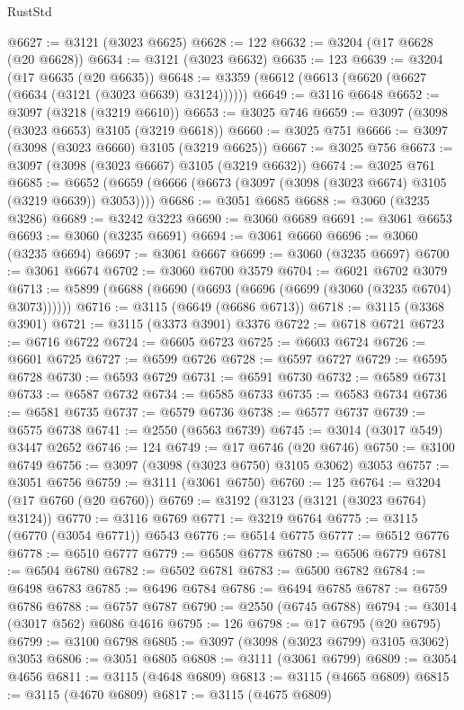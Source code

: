\begin{lexlean}{RustStd}
\begin{coremodule}
@6627 := @3121 (@3023 @6625)
@6628 := 122
@6632 := @3204 (@17 @6628 (@20 @6628))
@6634 := @3121 (@3023 @6632)
@6635 := 123
@6639 := @3204 (@17 @6635 (@20 @6635))
@6648 := @3359 (@6612 (@6613 (@6620 (@6627 (@6634 (@3121 (@3023 @6639) @3124))))))
@6649 := @3116 @6648
@6652 := @3097 (@3218 (@3219 @6610))
@6653 := @3025 @746
@6659 := @3097 (@3098 (@3023 @6653) @3105 (@3219 @6618))
@6660 := @3025 @751
@6666 := @3097 (@3098 (@3023 @6660) @3105 (@3219 @6625))
@6667 := @3025 @756
@6673 := @3097 (@3098 (@3023 @6667) @3105 (@3219 @6632))
@6674 := @3025 @761
@6685 := @6652 (@6659 (@6666 (@6673 (@3097 (@3098 (@3023 @6674) @3105 (@3219 @6639)) @3053))))
@6686 := @3051 @6685
@6688 := @3060 (@3235 @3286)
@6689 := @3242 @3223
@6690 := @3060 @6689
@6691 := @3061 @6653
@6693 := @3060 (@3235 @6691)
@6694 := @3061 @6660
@6696 := @3060 (@3235 @6694)
@6697 := @3061 @6667
@6699 := @3060 (@3235 @6697)
@6700 := @3061 @6674
@6702 := @3060 @6700 @3579
@6704 := @6021 @6702 @3079
@6713 := @5899 (@6688 (@6690 (@6693 (@6696 (@6699 (@3060 (@3235 @6704) @3073))))))
@6716 := @3115 (@6649 (@6686 @6713))
@6718 := @3115 (@3368 @3901)
@6721 := @3115 (@3373 @3901) @3376
@6722 := @6718 @6721
@6723 := @6716 @6722
@6724 := @6605 @6723
@6725 := @6603 @6724
@6726 := @6601 @6725
@6727 := @6599 @6726
@6728 := @6597 @6727
@6729 := @6595 @6728
@6730 := @6593 @6729
@6731 := @6591 @6730
@6732 := @6589 @6731
@6733 := @6587 @6732
@6734 := @6585 @6733
@6735 := @6583 @6734
@6736 := @6581 @6735
@6737 := @6579 @6736
@6738 := @6577 @6737
@6739 := @6575 @6738
@6741 := @2550 (@6563 @6739)
@6745 := @3014 (@3017 @549) @3447 @2652
@6746 := 124
@6749 := @17 @6746 (@20 @6746)
@6750 := @3100 @6749
@6756 := @3097 (@3098 (@3023 @6750) @3105 @3062) @3053
@6757 := @3051 @6756
@6759 := @3111 (@3061 @6750)
@6760 := 125
@6764 := @3204 (@17 @6760 (@20 @6760))
@6769 := @3192 (@3123 (@3121 (@3023 @6764) @3124))
@6770 := @3116 @6769
@6771 := @3219 @6764
@6775 := @3115 (@6770 (@3054 @6771)) @6543
@6776 := @6514 @6775
@6777 := @6512 @6776
@6778 := @6510 @6777
@6779 := @6508 @6778
@6780 := @6506 @6779
@6781 := @6504 @6780
@6782 := @6502 @6781
@6783 := @6500 @6782
@6784 := @6498 @6783
@6785 := @6496 @6784
@6786 := @6494 @6785
@6787 := @6759 @6786
@6788 := @6757 @6787
@6790 := @2550 (@6745 @6788)
@6794 := @3014 (@3017 @562) @6086 @4616
@6795 := 126
@6798 := @17 @6795 (@20 @6795)
@6799 := @3100 @6798
@6805 := @3097 (@3098 (@3023 @6799) @3105 @3062) @3053
@6806 := @3051 @6805
@6808 := @3111 (@3061 @6799)
@6809 := @3054 @4656
@6811 := @3115 (@4648 @6809)
@6813 := @3115 (@4665 @6809)
@6815 := @3115 (@4670 @6809)
@6817 := @3115 (@4675 @6809)

\end{coremodule}
\end{lexlean}
